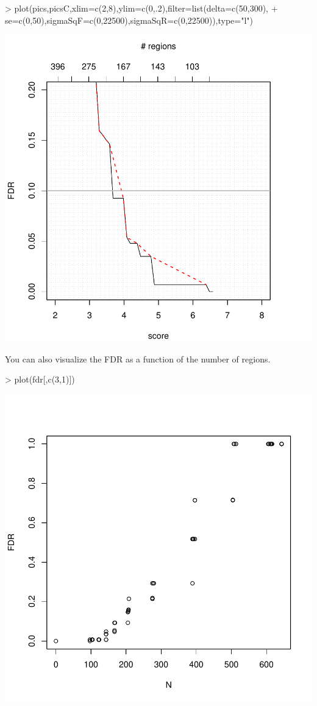 \documentclass[a4paper]{article}
\begin{document}
\begin{Schunk}
\begin{Sinput}
> plot(pics,picsC,xlim=c(2,8),ylim=c(0,.2),filter=list(delta=c(50,300),
+ se=c(0,50),sigmaSqF=c(0,22500),sigmaSqR=c(0,22500)),type="l")
\end{Sinput}
\end{Schunk}
\includegraphics{PICS-plot-FDR1}

You can also visualize the FDR as a function of the number of regions.

\begin{Schunk}
\begin{Sinput}
> plot(fdr[,c(3,1)])
\end{Sinput}
\end{Schunk}
\includegraphics{PICS-plot-FDR2}
\end{document}
